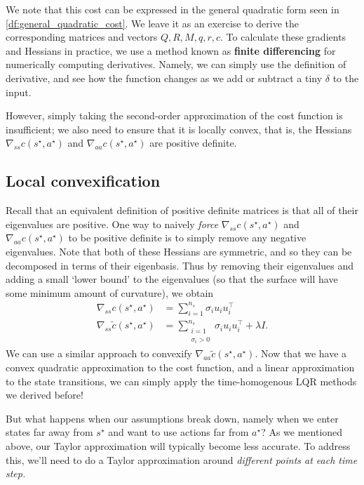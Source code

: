 \documentclass[../main/main]{subfiles}
\begin{document}
We note that this cost can be expressed in the general quadratic form seen in \autoref{df:general_quadratic_cost}.
We leave it as an exercise to derive the corresponding matrices and vectors $Q, R, M, q, r, c.$
To calculate these gradients and Hessians in practice, we use a method known as \textbf{finite differencing} for numerically computing derivatives.
Namely, we can simply use the definition of derivative, and see how the function changes as we add or subtract a tiny $\delta$ to the input.

However, simply taking the second-order approximation of the cost function is insufficient;
we also need to ensure that it is locally convex, that is, the Hessians $\nabla_{ss} c(s^\star, a^\star)$ and $\nabla_{aa} c(s^\star, a^\star)$ are positive definite.

\subsection{Local convexification}

Recall that an equivalent definition of positive definite matrices is that all of their eigenvalues are positive. One way to naively \emph{force} $\nabla_{ss} c(s^\star, a^\star)$ and $\nabla_{aa} c(s^\star, a^\star)$ to be positive definite is to simply remove any negative eigenvalues.
Note that both of these Hessians are symmetric, and so they can be decomposed in terms of their eigenbasis. Thus by removing their eigenvalues and adding a small `lower bound' to the eigenvalues (so that the surface will have some minimum amount of curvature), we obtain
\begin{align*}
    \nabla_{ss} c(s^\star, a^\star) &= \sum_{i=1}^{n_s} \sigma_i u_i u_i^\top \\
    \nabla_{ss} \widetilde c(s^\star, a^\star) &= \sum_{\substack{i=1 \\ \sigma_i > 0}}^{n_s} \sigma_i u_i u_i^\top + \lambda I.
\end{align*}
We can use a similar approach to convexify $\nabla_{aa} \widetilde{c}(s^\star, a^\star).$ Now that we have a convex quadratic approximation to the cost function, and a linear approximation to the state transitions, we can simply apply the time-homogenous LQR methods we derived before!


But what happens when our assumptions break down, namely when we enter states far away from $s^\star$ and want to use actions far from $a^\star$?
As we mentioned above, our Taylor approximation will typically become less accurate.
To address this, we'll need to do a Taylor approximation around \emph{different points at each time step.}
\end{document}
